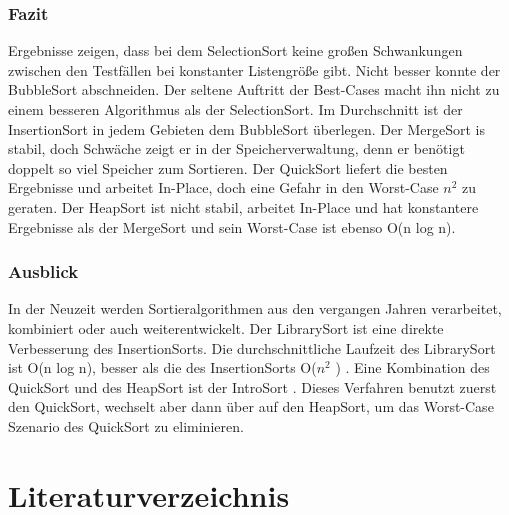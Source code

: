 \documentclass{article}
\begin{document}
\subsubsection{Fazit}
Ergebnisse zeigen, dass bei dem SelectionSort keine großen Schwankungen zwischen den Testfällen bei konstanter Listengröße gibt. Nicht besser konnte der BubbleSort abschneiden. Der seltene Auftritt der Best-Cases macht ihn nicht zu einem besseren Algorithmus als der SelectionSort. Im Durchschnitt ist der InsertionSort in jedem Gebieten dem BubbleSort überlegen. Der MergeSort is stabil, doch Schwäche zeigt er in der Speicherverwaltung, denn er benötigt doppelt so viel Speicher zum Sortieren. Der QuickSort liefert die besten Ergebnisse und arbeitet In-Place, doch eine Gefahr in den Worst-Case $n^{2}$ zu geraten. Der HeapSort ist nicht stabil, arbeitet In-Place und hat konstantere Ergebnisse als der MergeSort und sein Worst-Case ist ebenso O(n log n).
\subsubsection{Ausblick}
In der Neuzeit werden Sortieralgorithmen aus den vergangen Jahren verarbeitet, kombiniert oder auch weiterentwickelt. Der LibrarySort ist eine direkte Verbesserung des InsertionSorts. Die durchschnittliche Laufzeit des LibrarySort ist O(n log n), besser als die des InsertionSorts O($n^{2}$ ) \cite{librarySort}.
Eine Kombination des QuickSort und des HeapSort ist der IntroSort \cite{introSort}. Dieses Verfahren benutzt zuerst den QuickSort, wechselt aber dann über auf den HeapSort, um das Worst-Case Szenario des QuickSort zu eliminieren.

\section{Literaturverzeichnis}

%



\end{document}
